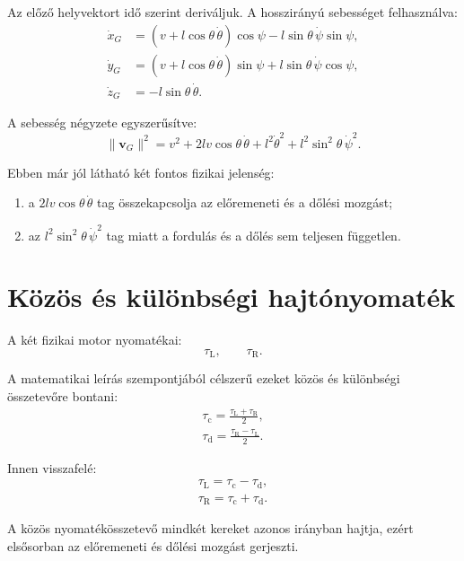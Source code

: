 \documentclass[12pt,a4paper]{article}
\newcommand{\tauL}{\tau_{\mathrm{L}}}
\newcommand{\tauR}{\tau_{\mathrm{R}}}
\newcommand{\tauc}{\tau_{\mathrm{c}}}
\newcommand{\taud}{\tau_{\mathrm{d}}}
\begin{document}
	Az előző helyvektort idő szerint deriváljuk. A hosszirányú sebességet felhasználva:
	\begin{align}
		\dot x_G &= (v+l\cos\theta\,\dot\theta)\cos\psi
		-l\sin\theta\,\dot\psi\sin\psi,\\
		\dot y_G &= (v+l\cos\theta\,\dot\theta)\sin\psi
		+l\sin\theta\,\dot\psi\cos\psi,\\
		\dot z_G &= -l\sin\theta\,\dot\theta.
	\end{align}
	
	A sebesség négyzete egyszerűsítve:
	\begin{equation}
		\|\bm v_G\|^2
		=v^2
		+2lv\cos\theta\,\dot\theta
		+l^2\dot\theta^2
		+l^2\sin^2\theta\,\dot\psi^2.
	\end{equation}
	
	Ebben már jól látható két fontos fizikai jelenség:
	\begin{enumerate}[leftmargin=2em]
		\item a $2lv\cos\theta\,\dot\theta$ tag összekapcsolja az előremeneti és a dőlési mozgást;
		\item az $l^2\sin^2\theta\,\dot\psi^2$ tag miatt a fordulás és a dőlés sem teljesen független.
	\end{enumerate}
	
	\section{Közös és különbségi hajtónyomaték}
	
	A két fizikai motor nyomatékai:
	\begin{equation}
		\tauL,\qquad \tauR.
	\end{equation}
	
	A matematikai leírás szempontjából célszerű ezeket közös és különbségi összetevőre bontani:
	\begin{align}
		\boxed{\tauc=\frac{\tauL+\tauR}{2}},\\
		\boxed{\taud=\frac{\tauR-\tauL}{2}}.
	\end{align}
	
	Innen visszafelé:
	\begin{align}
		\boxed{\tauL=\tauc-\taud},\\
		\boxed{\tauR=\tauc+\taud}.
	\end{align}
	
	A közös nyomatékösszetevő mindkét kereket azonos irányban hajtja, ezért elsősorban az előremeneti és dőlési mozgást gerjeszti.
	
\end{document}
